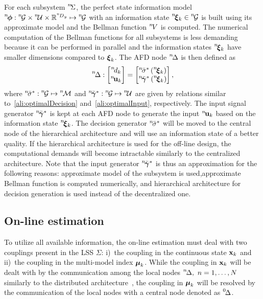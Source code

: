 \documentclass[conference,letterpaper]{IEEEtran}
\def\zeroth{\prescript{0\!}{}}
\def\nth{\prescript{n\!}{}}
\def\dec{\text{dec}}
\begin{document}
For each subsystem $\nth{\Sigma}$, the perfect state information model $\nth{\bfphi}:\nth{\mcG} \times \nth{\mcU} \times \bbR^{\nth{D}_y} \mapsto \nth{\mcG}$ with an information state $\nth{\bfxi}_{k}\in\nth{\mcG}$ is built using its approximate model and the Bellman function $\nth{V}$ is computed. 
The numerical computation of the Bellman functions for all subsystems is less demanding because it can be performed in parallel and the information states $\nth{\bfxi}_{k}$ have smaller dimensions compared to $\boldsymbol{\xi}_{k}$. 
The AFD node $\nth{\Delta}$ is then defined as
\begin{align}\label{ali:DeAFD}
	\nth{\Delta}:
	\begin{bmatrix}
		\nth{d}_{k}\\
		\nth{\bfu}_{k}
	\end{bmatrix} =%
	\begin{bmatrix}
		\nth{\bar{\sigma}}^{*} \left( \nth{\bfxi}_{k} \right)\\
		\nth{\bar{\bfgamma}}^{*} \left( \nth{\bfxi}_{k} \right)
	\end{bmatrix},
\end{align} 
where $\nth{\bar{\sigma}}^{*}:\nth{\mcG}\mapsto\nth{\mcM}$ and $\nth{\bar{\bfgamma}}^{*}:\nth{\mcG} \mapsto \nth{\mcU}$ are given by relations similar to~\eqref{ali:optimalDecision} and~\eqref{ali:optimalInput}, respectively. 
The input signal generator $\nth{\bar{\bfgamma}}^{*}$ is kept at each AFD node to generate the input $\nth{\bfu}_{k}$ based on the information state $\nth{\bfxi}_{k}$. 
The decision generator $\nth{\bar{\sigma}}^{*}$ will be moved to the central node of the hierarchical architecture and will use an information state of a better quality. 
If the hierarchical architecture is used for the off-line design, the computational demands will become intractable similarly to the centralized architecture. 
Note that the input generator $\nth{\bar{\bfgamma}}^{*}$ is thus an approximation for the following reasons: approximate model of the subsystem is used,approximate Bellman function is computed numerically, and hierarchical architecture for decision generation is used instead of the decentralized one. 
\subsection{On-line estimation}\label{sec:on_line_estimation}
To utilize all available information, the on-line estimation must deal with two couplings present in the LSS $\Sigma$: i)~the coupling in the continuous state $\mathbf{x}_k$ and ii)~the coupling in the multi-model index $\boldsymbol{\mu}_k$.
While the coupling in $\mathbf{x}_k$ will be dealt with by the communication among the local nodes $\nth{\Delta},\ n=1,\ldots,N$ similarly to the distributed architecture~\cite{Straka2019:cp:FUSION}, the coupling in $\boldsymbol{\mu}_k$ will be resolved by the communication of the local nodes with a central node denoted as $\zeroth{\Delta}$.
\end{document}
